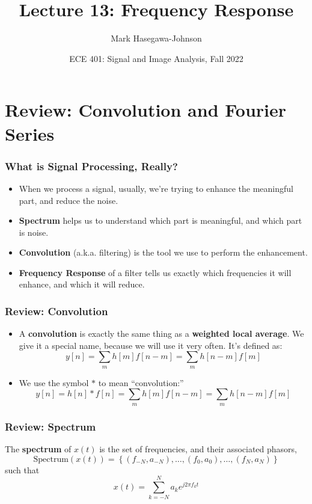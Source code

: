 \documentclass{beamer}
\title{Lecture 13: Frequency Response}
\author{Mark Hasegawa-Johnson}
\date{ECE 401: Signal and Image Analysis, Fall 2022}
\begin{document}
\begin{frame}
  \maketitle
\end{frame}

\begin{frame}
  \tableofcontents
\end{frame}

\section[Review]{Review: Convolution and Fourier Series}
\setcounter{subsection}{1}

\begin{frame}
  \frametitle{What is Signal Processing, Really?}

  \begin{itemize}
  \item When we process a signal, usually, we're trying to
    enhance the meaningful part, and reduce the noise.
  \item {\bf Spectrum} helps us  to understand which part is
    meaningful, and which part is noise.
  \item {\bf Convolution} (a.k.a. filtering) is the tool we use to
    perform the enhancement.
  \item {\bf Frequency Response} of a filter tells us exactly which
    frequencies it will enhance, and which it will reduce.
  \end{itemize}
\end{frame}

\begin{frame}
  \frametitle{Review: Convolution}
  \begin{itemize}
  \item A {\bf convolution} is exactly the same thing as a {\bf weighted local average}.
    We give it a special name, because we will use it very often.  It's defined as:
    \[
    y[n] = \sum_m h[m] f[n-m] = \sum_m h[n-m] f[m]
    \]
  \item 
    We use the symbol $\ast$ to mean ``convolution:''
    \[
    y[n]=h[n]\ast f[n] = \sum_m h[m] f[n-m] = \sum_m h[n-m] f[m]
    \]
  \end{itemize}
\end{frame}

\begin{frame}
  \frametitle{Review: Spectrum}

  The {\bf spectrum} of $x(t)$ is the set of frequencies, and their
  associated phasors,
  \[
  \mbox{Spectrum}\left( x(t) \right) =
  \left\{ (f_{-N},a_{-N}), \ldots, (f_0,a_0), \ldots, (f_N,a_N) \right\}
  \]
  such that
  \[
  x(t) = \sum_{k=-N}^N a_ke^{j2\pi f_kt}
  \]
\end{frame}
\end{document}
